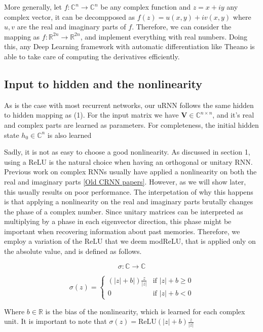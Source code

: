 \documentclass{article} %
\newcommand{\matr}[1]{\mathbf{#1}}
\newcommand\RR{\mathbb{R}}
\newcommand\CC{\mathbb{C}}
\begin{document}
More generally, let $f: \CC^n \rightarrow \CC^n$ be any complex function and $z = x + i y$ any complex vector, it can be decompposed as $ f(z) = u(x, y) + i v(x, y) $ where $u,v$ are the real and imaginary parts of $f$. Therefore, we can consider the mapping as $f: \RR^{2n}  \rightarrow \RR^{2n}$, and implement everything with real numbers. Doing this, any Deep Learning framework with automatic differentiation like Theano \citep{Fred2010} is able to take care of computing the derivatives efficiently.

\subsection{Input to hidden and the nonlinearity}

As is the case with most recurrent networks, our uRNN follows the same hidden to hidden mapping as (1). For the input matrix we have $\matr{V} \in \CC^{n \times n}$, and it's real and complex parts are learned as parameters. For completeness, the initial hidden state $h_0 \in \CC^n$ is also learned 

Sadly, it is not as easy to choose a good nonlinearity. As discussed in section 1, using a ReLU is the natural choice when having an orthogonal or unitary RNN. Previous work on complex RNNs usually have applied a nonlinearity on both the real and imaginary parts \ref{Old CRNN papers}. However, as we will show later, this usually results on poor performance. The interpetation of why this happens is that applying a nonlinearity on the real and imaginary parts brutally changes the phase of a complex number. Since unitary matrices can be interpreted as multiplying by a phase in each eigenvector direction, this phase might be important when recovering information about past memories. Therefore, we employ a variation of the ReLU that we deem modReLU, that is applied only on the absolute value, and is defined as follows.

$$ \sigma: \CC \rightarrow \CC $$

$$ \sigma (z) = 
\left\{
  \begin{array}{ll}
    (|z|+b|) \frac{z}{|z|}  & \mbox{if } |z| + b \geq 0 \\
    0 & \mbox{if } |z| + b < 0
  \end{array}
\right.
$$


Where $b \in \RR$ is the bias of the nonlinearity, which is learned for each complex unit. It is important to note that $\sigma(z) = \text{ReLU}(|z| + b) \frac{z}{|z|}$
\end{document}
